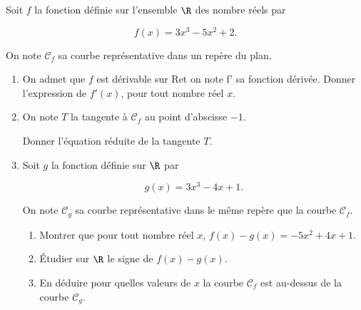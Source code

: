\medskip

 
Soit $f$ la fonction définie sur l'ensemble $\R$ des nombre réels par 

\[f(x) = 3x^3 - 5x^2 + 2.\]

On note $\mathcal{C}_f$ sa courbe représentative dans un repère du plan.

\medskip

\begin{enumerate}
\item On admet que $f$ est dérivable sur Ret on note f' sa fonction dérivée.
Donner l'expression de $f'(x)$, pour tout nombre réel $x$.
\item On note $T$ la tangente à $\mathcal{C}_f$ au point d'abscisse $- 1$.

Donner l'équation réduite de la tangente $T$.
\item  Soit $g$ la fonction définie sur $\R$ par 

\[g(x) = 3x^3 - 4x + 1.\]

On note $\mathcal{C}_g$ sa courbe représentative dans le même repère que la courbe $\mathcal{C}_f$. 
	\begin{enumerate}
		\item Montrer que pour tout nombre réel $x$, \:$f(x) - g(x) = -5x^2 + 4x + 1$.
		\item Étudier sur $\R$ le signe de $f(x) - g(x)$.
		\item En déduire pour quelles valeurs de $x$ la courbe $\mathcal{C}_f$ est au-dessus de la courbe $\mathcal{C}_g$.
	\end{enumerate}
\end{enumerate}
